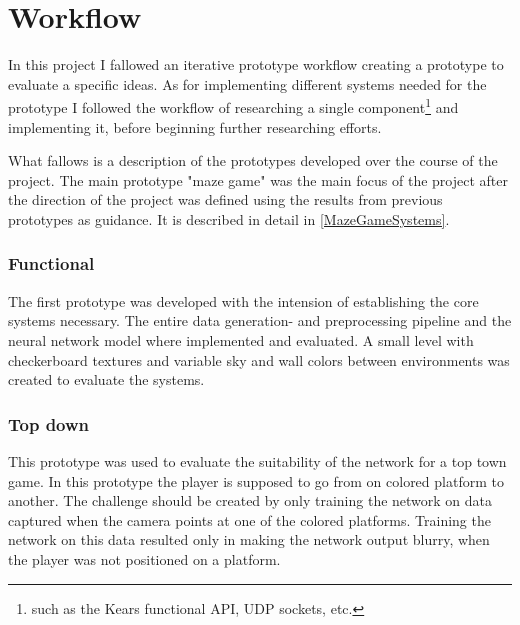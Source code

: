 
\chapter{Workflow}
In this project I fallowed an iterative prototype workflow creating a prototype to evaluate a specific ideas. As for implementing different systems needed for the prototype I followed the workflow of researching a single component\footnote{such as the Kears functional API, UDP sockets, etc.} and implementing it, before beginning further researching efforts.

What fallows is a description of the prototypes developed over the course of the project. The main prototype "maze game" was the main focus of the project after the direction of the project was defined using the results from previous prototypes as guidance. It is described in detail in \cref{MazeGameSystems}.


\subsection{Functional}
The first prototype was developed with the intension of establishing the core systems necessary. The entire data generation- and preprocessing pipeline and the neural network model where implemented and evaluated. A small level with checkerboard textures and variable sky and wall colors between environments was created to evaluate the systems. 



\subsection{Top down}
This prototype was used to evaluate the suitability of the network for a top town game. In this prototype the player is supposed to go from on colored platform to another. The challenge should be created by only training the network on data captured when the camera points at one of the colored platforms. Training the network on this data resulted only in making the network output blurry, when the player was not positioned on a platform.



